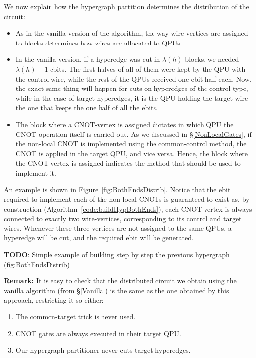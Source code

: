 We now explain how the hypergraph partition determines the distribution of the circuit:

\begin{itemize}
  \item As in the vanilla version of the algorithm, the way wire-vertices are assigned to blocks determines how wires are allocated to QPUs.
  \item In the vanilla version, if a hyperedge was cut in \(\lambda(h)\) blocks, we needed \(\lambda(h)-1\) ebits. The first halves of all of them were kept by the QPU with the control wire, while the rest of the QPUs received one ebit half each. Now, the exact same thing will happen for cuts on hyperedges of the control type, while in the case of target hyperedges, it is the QPU holding the target wire the one that keeps the one half of all the ebits. 
  \item The block where a CNOT-vertex is assigned dictates in which QPU the CNOT operation itself is carried out. As we discussed in \S\ref{NonLocalGates}, if the non-local CNOT is implemented using the common-control method, the CNOT is applied in the target QPU, and vice versa. Hence, the block where the CNOT-vertex is assigned indicates the method that should be used to implement it. 
\end{itemize}

An example is shown in Figure~\ref{fig:BothEndsDistrib}. Notice that the ebit required to implement each of the non-local CNOTs is guaranteed to exist as, by construction (Algorithm~\ref{code:buildHypBothEnds}), each CNOT-vertex is always connected to exactly two wire-vertices, corresponding to its control and target wires. Whenever these three vertices are not assigned to the same QPUs, a hyperedge will be cut, and the required ebit will be generated.

\textbf{TODO}: Simple example of building step by step the previous hypergraph (fig:BothEndsDistrib)

\begin{mdframed}[backgroundcolor=gray!20,leftmargin=20pt,rightmargin=20pt, innerbottommargin=10pt] 
\small
\textbf{Remark:} It is easy to check that the distributed circuit we obtain using the vanilla algorithm (from \S\ref{Vanilla}) is the same as the one obtained by this approach, restricting it so either:
\begin{enumerate}
  \renewcommand{\theenumi}{\alph{enumi})}
  \item The common-target trick is never used.
  \item CNOT gates are always executed in their target QPU.
  \item Our hypergraph partitioner never cuts target hyperedges.
\end{enumerate}
\end{mdframed}

